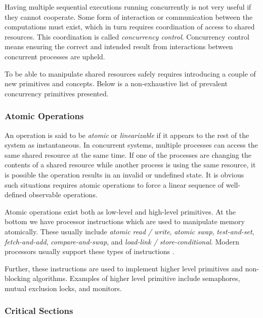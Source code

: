 Having multiple sequential executions running concurrently is not very useful if they cannot cooperate. Some form of interaction or communication between the computations must exist, which in turn requires coordination of access to shared resources. This coordination is called \textit{concurrency control}. Concurrency control means ensuring the correct and intended result from interactions between concurrent processes are upheld. 

To be able to manipulate shared resources safely requires introducing a couple of new primitives and concepts. Below is a non\hyp{}exhaustive list of prevalent concurrency primitives presented.


\subsubsection{Atomic Operations}


An operation is said to be \textit{atomic} or \textit{linearizable} if it appears to the rest of the system as instantaneous. In concurrent systems, multiple processes can access the same shared resource at the same time. If one of the processes are changing the contents of a shared resource while another process is using the same resource, it is possible the operation results in an invalid or undefined state. It is obvious such situations requires atomic operations to force a linear sequence of well\hyp{}defined observable operations. 

Atomic operations exist both as low\hyp{}level and high\hyp{}level primitives. At the bottom we have processor instructions which are used to manipulate memory atomically. These usually include \textit{atomic read / write}, \textit{atomic swap}, \textit{test\hyp{}and\hyp{}set}, \textit{fetch\hyp{}and\hyp{}add}, \textit{compare\hyp{}and\hyp{}swap}, and \textit{load\hyp{}link / store\hyp{}conditional}. Modern processors usually support these types of instructions \citep{buck2009atomic}.

Further, these instructions are used to implement higher level primitives and non\hyp{}blocking algorithms. Examples of higher level primitive include semaphores, mutual exclusion locks, and monitors.


\subsubsection{Critical Sections}


